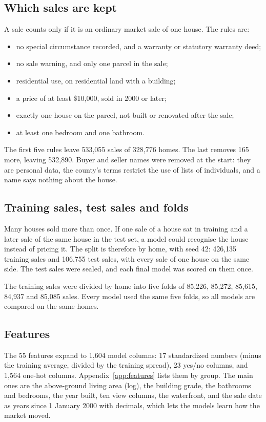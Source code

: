 \documentclass[sigconf,nonacm,10pt]{acmart}
\begin{document}
\subsection{Which sales are kept}
A sale counts only if it is an ordinary market sale of one house. The rules are:
\begin{itemize}
\item no special circumstance recorded, and a warranty or statutory warranty deed;
\item no sale warning, and only one parcel in the sale;
\item residential use, on residential land with a building;
\item a price of at least \$10,000, sold in 2000 or later;
\item exactly one house on the parcel, not built or renovated after the sale;
\item at least one bedroom and one bathroom.
\end{itemize}
The first five rules leave 533,055 sales of 328,776 homes. The last removes 165 more, leaving 532,890. Buyer and seller names were removed at the start: they are personal data, the county's terms restrict the use of lists of individuals, and a name says nothing about the house.

\subsection{Training sales, test sales and folds}
Many houses sold more than once. If one sale of a house sat in training and a later sale of the same house in the test set, a model could recognise the house instead of pricing it. The split is therefore by home, with seed 42: 426,135 training sales and 106,755 test sales, with every sale of one house on the same side. The test sales were sealed, and each final model was scored on them once.

The training sales were divided by home into five folds of 85,226, 85,272, 85,615, 84,937 and 85,085 sales. Every model used the same five folds, so all models are compared on the same homes.

\subsection{Features}
The 55 features expand to 1,604 model columns: 17 standardized numbers (minus the training average, divided by the training spread), 23 yes/no columns, and 1,564 one-hot columns. Appendix~\ref{app:features} lists them by group. The main ones are the above-ground living area (log), the building grade, the bathrooms and bedrooms, the year built, ten view columns, the waterfront, and the sale date as years since 1 January 2000 with decimals, which lets the models learn how the market moved.
\end{document}
